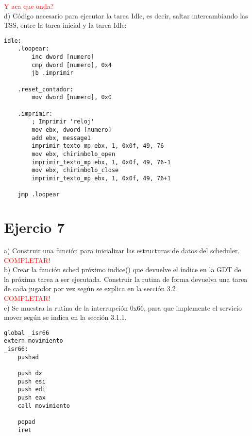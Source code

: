 \documentclass[a4paper]{article}
\begin{document}
\textcolor{red}{Y aca que onda?}\\

{\large d)} C\'odigo necesario para ejecutar la tarea Idle, es decir, saltar intercambiando las
TSS, entre la tarea inicial y la tarea Idle:

\begin{codesnippet}
\begin{verbatim}
idle:
    .loopear:
        inc dword [numero]
        cmp dword [numero], 0x4
        jb .imprimir

    .reset_contador:
        mov dword [numero], 0x0

    .imprimir:
        ; Imprimir 'reloj'
        mov ebx, dword [numero]
        add ebx, message1
        imprimir_texto_mp ebx, 1, 0x0f, 49, 76
        mov ebx, chirimbolo_open
        imprimir_texto_mp ebx, 1, 0x0f, 49, 76-1
        mov ebx, chirimbolo_close
        imprimir_texto_mp ebx, 1, 0x0f, 49, 76+1

    jmp .loopear
\end{verbatim}
\end{codesnippet}

\newpage
\section{Ejercio 7}
{\large a)} Construir una funci\'on para inicializar las estructuras de datos del scheduler.\\

\textcolor{red}{COMPLETAR!}\\

{\large b)} Crear la funci\'on sched pr\'oximo indice() que devuelve el \'indice en la GDT de la pr\'oxima
tarea a ser ejecutada. Construir la rutina de forma devuelva una tarea de cada jugador
por vez seg\'un se explica en la secci\'on 3.2\\


\textcolor{red}{COMPLETAR!}\\

{\large c)} Se muestra la rutina de la interrupci\'on 0x66, para que implemente el servicio mover seg\'un
se indica en la secci\'on 3.1.1.\\

\begin{codesnippet}
\begin{verbatim}
global _isr66
extern movimiento
_isr66:
    pushad
    
    push dx
    push esi
    push edi
    push eax
    call movimiento

    popad
    iret
\end{verbatim}
\end{codesnippet}
\end{document}
